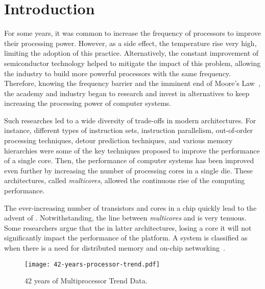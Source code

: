 \chapter{Introduction}
\label{ch.intro}

	For some years, it was common to increase the frequency of processors
	to improve their processing power.
	However, as a side effect, the temperature rise very high, limiting the
	adoption of this practice.
	Alternatively, the constant improvement of semiconductor technology helped
	to mitigate the impact of this problem, allowing the industry to build
	more powerful processors with the same frequency.
	Therefore, knowing the frequency barrier and the imminent end of Moore's Law~\cite{moore:1965},
	the academy and industry began to research and invest in alternatives
	to keep increasing the processing power of computer systems.

	Such researches led to a wide diversity of trade-offs in modern architectures.
	For instance, different types of instruction sets, instruction parallelism,
	out-of-order processing techniques, detour prediction techniques, and various
	memory hierarchies were some of the key techniques proposed to improve the
	performance of a single core.
	Then, the performance of computer systems has been improved even further by
	increasing the number of processing cores in a single die.
	These architectures, called \textit{multicores}, allowed the continuous
	rise of the computing performance.

	The ever-increasing number of transistors and cores in a chip quickly lead
	to the advent of \manycores.
	Notwithstanding, the line between \textit{multicores} and \manycores is very tenuous.
	Some researchers argue that the in latter architectures, losing a core it will not
	significantly impact the performance of the platform.
	A system is classified as \manycore when there is a need for distributed
	memory and on-chip networking~\cite{freitas:thesis}.

	\begin{figure}[t]
		\centering
		\caption{42 years of Multiprocessor Trend Data.}
		\label{fig:microprocessor-data}


		\texttt{[image: 42-years-processor-trend.pdf]}
	\end{figure}


